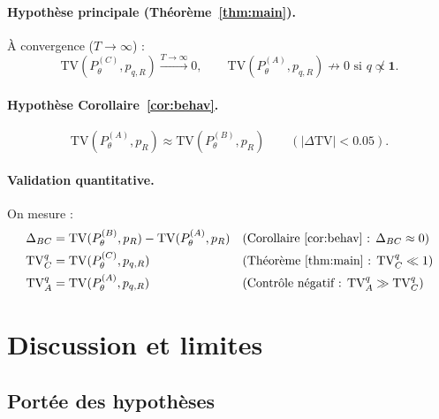 \documentclass[11pt,a4paper]{article}
\theoremstyle{plain}
\theoremstyle{definition}
\theoremstyle{remark}
\newcommand{\pth}{P_\theta}
\newcommand{\pR}{p_R}
\newcommand{\TV}{\mathrm{TV}}
\begin{document}
\paragraph{Hypothèse principale (Théorème~\ref{thm:main}).}
À convergence ($T \to \infty$) :
\begin{equation}
  \TV(\pth^{(C)}, p_{q,R}) \xrightarrow{T\to\infty} 0,
  \qquad
  \TV(\pth^{(A)}, p_{q,R}) \not\to 0 \text{ si } q \not\propto \mathbf{1}.
\end{equation}

\paragraph{Hypothèse Corollaire~\ref{cor:behav}.}
\begin{equation}
  \TV(\pth^{(A)}, \pR) \approx \TV(\pth^{(B)}, \pR) \qquad (|\Delta\TV| < 0.05).
\end{equation}

\paragraph{Validation quantitative.}
On mesure :
\begin{align}
  \Delta_{BC} &= \TV(\pth^{(B)}, \pR) - \TV(\pth^{(A)}, \pR)
  && \text{(Corollaire~\ref{cor:behav} : } \Delta_{BC} \approx 0 \text{)} \\
  \mathrm{TV}_C^{q} &= \TV(\pth^{(C)}, p_{q,R})
  && \text{(Théorème~\ref{thm:main} : TV}_C^q \ll 1 \text{)} \\
  \mathrm{TV}_A^{q} &= \TV(\pth^{(A)}, p_{q,R})
  && \text{(Contrôle négatif : TV}_A^q \gg \mathrm{TV}_C^q \text{)}
\end{align}

\section{Discussion et limites}
\label{sec:discussion}

\subsection{Portée des hypothèses}
\end{document}
